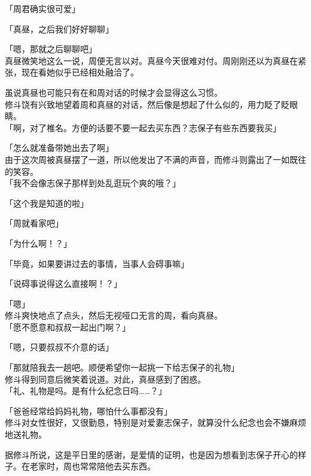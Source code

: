 「周君确实很可爱」

「真昼，之后我们好好聊聊」

「嗯，那就之后聊聊吧」\\

真昼微笑地这么一说，周便无言以对。真昼今天很难对付。周刚刚还以为真昼在紧张，现在看她似乎已经相处融洽了。

虽说真昼也可能只有在和周对话的时候才会显得这么习惯。\\

修斗饶有兴致地望着周和真昼的对话，然后像是想起了什么似的，用力眨了眨眼睛。\\

「啊，对了椎名。方便的话要不要一起去买东西？志保子有些东西要我买」

「怎么就准备带她出去了啊」\\

由于这次周被真昼摆了一道，所以他发出了不满的声音，而修斗则露出了一如既往的笑容。\\

「我不会像志保子那样到处乱逛玩个爽的哦？」

「这个我是知道的啦」

「周就看家吧」

「为什么啊！？」

「毕竟，如果要讲过去的事情，当事人会碍事嘛」

「说碍事说得这么直接啊！？」

「嗯」\\

修斗爽快地点了点头，然后无视哑口无言的周，看向真昼。\\

「愿不愿意和叔叔一起出门啊？」

「嗯，只要叔叔不介意的话」

「那就陪我去一趟吧。顺便希望你一起挑一下给志保子的礼物」\\

修斗得到同意后微笑着说道。对此，真昼感到了困惑。\\

「礼、礼物是吗。是有什么纪念日吗……？」

「爸爸经常给妈妈礼物，哪怕什么事都没有」\\

修斗对女性很好，又很勤恳，特别是对爱妻志保子，就算没什么纪念也会不嫌麻烦地送礼物。

据修斗所说，这是平日里的感谢，是爱情的证明，也是因为想看到志保子开心的样子。在老家时，周也常常陪他去买东西。\\

